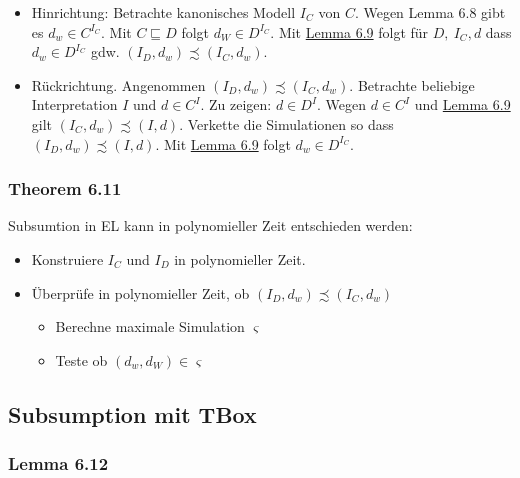 \begin{itemize}
\item
  Hinrichtung: Betrachte kanonisches Modell $I_{C}$ von $C$. Wegen
  Lemma 6.8 gibt es $d_{w} \in C^{I_{C}}$. Mit $C \sqsubseteq D$
  folgt $d_{W} \in D^{I_{C}}$. Mit \protect\hyperlink{lemma-6.9}{Lemma
  6.9} folgt für $D,\ I_{C},d$ dass $d_{w} \in D^{I_{C}}$ gdw.
  $\left( I_{D},d_{w} \right) \precsim \left( I_{C},d_{w} \right)$.
\item
  Rückrichtung. Angenommen
  $\left( I_{D},d_{w} \right) \precsim \left( I_{C},d_{w} \right)$.
  Betrachte beliebige Interpretation $I$ und $d \in C^{I}$. Zu
  zeigen: $d \in D^{I}$. Wegen $d \in C^{I}$ und
  \protect\hyperlink{lemma-6.9}{Lemma 6.9} gilt
  $\left( I_{C},d_{w} \right) \precsim \left( I,d \right)$. Verkette
  die Simulationen so dass
  $\left( I_{D},d_{w} \right) \precsim \left( I,d \right)$. Mit
  \protect\hyperlink{lemma-6.9}{Lemma 6.9} folgt
  $d_{w} \in D^{I_{C}}$.
\end{itemize}

\subsubsection{Theorem 6.11}\label{theorem-6.11}

Subsumtion in EL kann in polynomieller Zeit entschieden werden:

\begin{itemize}
\item
  Konstruiere $I_{C}$ und $I_{D}$ in polynomieller Zeit.
\item
  Überprüfe in polynomieller Zeit, ob
  $\left( I_{D},d_{w} \right) \precsim \left( I_{C},d_{w} \right)$

  \begin{itemize}
  \item
    Berechne maximale Simulation $\varsigma$
  \item
    Teste ob $\left( d_{w},d_{W} \right) \in \varsigma$
  \end{itemize}
\end{itemize}

\subsection{Subsumption mit TBox}\label{subsumption-mit-tbox}

\subsubsection{Lemma 6.12}\label{lemma-6.12}

